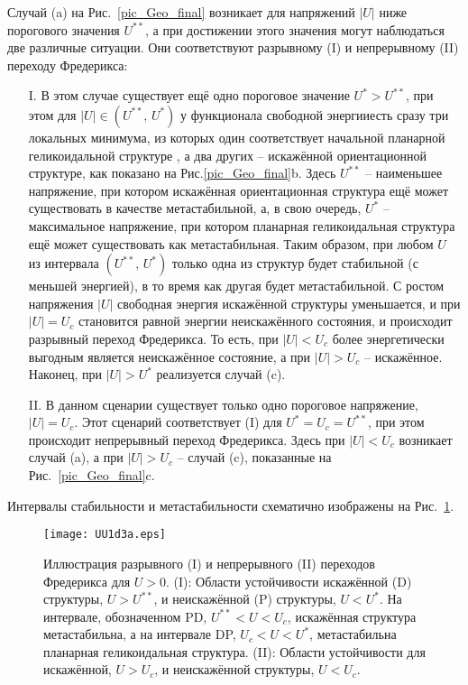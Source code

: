 Случай (a) на Рис.~\ref{pic_Geo_final} возникает для напряжений $|U|$ ниже порогового значения $U^{**}$, а при достижении этого значения могут наблюдаться две различные ситуации.
Они соответствуют разрывному (I) и непрерывному (II) переходу Фредерикса:
\begin{itemize}
	\item[I.]
	В этом случае существует ещё одно пороговое значение $U^{*} > U^{**}$, при этом для $|U|\in (U^{**},\, U^{*})$ у функционала свободной энергииесть сразу три локальных минимума, из которых один соответствует начальной планарной геликоидальной структуре	, а два других -- искажённой ориентационной структуре, как показано на Рис.\ref{pic_Geo_final}b.
	Здесь $U^{**}$ -- наименьшее напряжение, при котором искажённая ориентационная структура ещё может существовать в качестве метастабильной, а, в свою очередь, $U^{*}$ -- максимальное напряжение, при котором планарная геликоидальная структура ещё может существовать как метастабильная.
	Таким образом, при любом $U$ из интервала $(U^{**},\,U^*)$ только одна из структур будет стабильной (с меньшей энергией), в то время как другая будет метастабильной.
	С ростом напряжения $|U|$ свободная энергия искажённой структуры уменьшается, и при $|U| = U_c$ становится равной энергии неискажённого состояния, и происходит разрывный переход Фредерикса.
	То есть, при $|U| < U_c$ более энергетически выгодным является неискажённое состояние, а при $|U| > U_c$ -- искажённое.
	Наконец, при $|U|>U^*$ реализуется случай (c).
	\item[II.]
	В данном сценарии существует только одно пороговое напряжение, $|U| = U_c$. Этот сценарий соответствует (I) для $U^{*} = U_c = U^{**}$, при этом происходит непрерывный переход Фредерикса. 
	Здесь при $|U| < U_c$ возникает случай (a), а при  $|U|>U_c$ -- случай (c), показанные на Рис.~\ref{pic_Geo_final}c.
\end{itemize}
Интервалы стабильности и метастабильности схематично изображены на Рис.~\ref{pic-U*U**Uc_otline}.
\begin{figure}%
	\centering
	\texttt{[image: UU1d3a.eps]}
	\caption{Иллюстрация разрывного (I) и непрерывного (II) переходов Фредерикса для $U > 0$.
		(I): Области устойчивости искажённой (D) структуры, $U>U^{**}$, и неискажённой (P) структуры, $U<U^{*}$.
		На интервале, обозначенном PD, $U^{**}<U<U_c$, искажённая структура метастабильна, а на интервале DP, $U_c < U < U^{*}$, метастабильна планарная геликоидальная структура.
		(II):  Области устойчивости для искажённой, $U > U_c$, и неискажённой структуры, $U < U_c$.}
	\label{pic-U*U**Uc_otline}
\end{figure}

